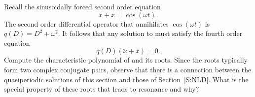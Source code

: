\begin{exercise}  \label{c12.5.4}
Recall the sinusoidally forced second order equation 
\[
\ddot x + x = \cos(\omega t).
\]
The second order differential operator that annihilates $\cos(\omega t)$ is
$q(D)=D^2+\omega^2$.  It follows that any solution to  must
satisfy the fourth order equation 
\begin{equation} \label{E:ann=res}
q(D)(\ddot x + x)=0.
\end{equation}
Compute the characteristic polynomial of  and its roots. Since
the roots typically form two complex conjugate pairs, observe that there is a
connection between the quasiperiodic solutions of this section and those of
Section~\ref{S:NLD}.  What is the special property of these roots that leads
to resonance and why?
\end{exercise}



